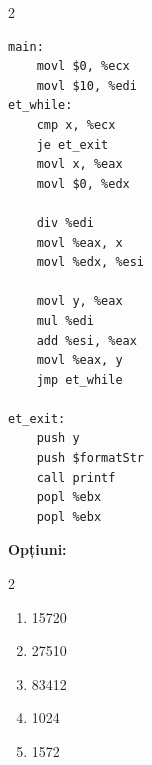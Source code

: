 \documentclass[12pt,a4paper]{article}
\begin{document}
\begin{multicols}{2}
\begin{lstlisting}[language=x86asm]
main:
    movl $0, %ecx
    movl $10, %edi
et_while:
    cmp x, %ecx
    je et_exit
    movl x, %eax
    movl $0, %edx

    div %edi
    movl %eax, x
    movl %edx, %esi

    movl y, %eax
    mul %edi
    add %esi, %eax
    movl %eax, y
    jmp et_while

et_exit:
    push y
    push $formatStr
    call printf
    popl %ebx
    popl %ebx
\end{lstlisting}
\end{multicols}

\textbf{Opțiuni:}
\begin{multicols}{2}
\begin{enumerate}[label=\alph*)]
    \item 15720
    \item 27510 
    \item 83412
    \item 1024
    \item 1572
\end{enumerate}
\end{multicols}

\newpage
\end{document}
